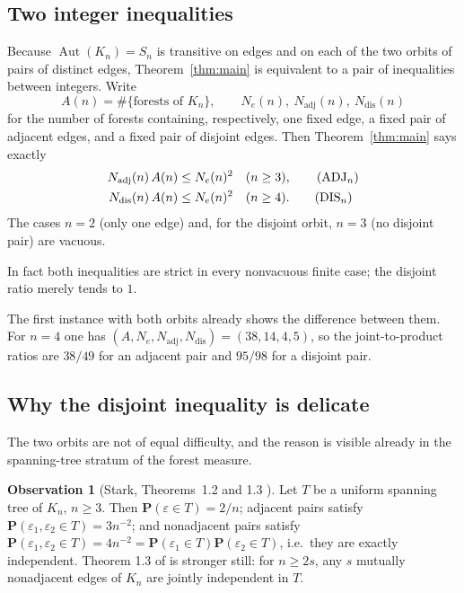 \documentclass[11pt,a4paper]{amsart}
\theoremstyle{plain}
\theoremstyle{definition}
\newtheorem{observation}[theorem]{Observation}
\newcommand{\PR}{\mathbf{P}}
\newcommand{\Nc}{N}
\begin{document}
\subsection{Two integer inequalities}

Because $\operatorname{Aut}(K_n) = S_n$ is transitive on edges and on each of the
two orbits of pairs of distinct edges, Theorem~\ref{thm:main} is equivalent to a
pair of inequalities between integers. Write
\[
  A(n) = \#\{\text{forests of } K_n\},\qquad
  \Nc_e(n),\ \Nc_{\mathrm{adj}}(n),\ \Nc_{\mathrm{dis}}(n)
\]
for the number of forests containing, respectively, one fixed edge, a fixed pair
of adjacent edges, and a fixed pair of disjoint edges. Then
Theorem~\ref{thm:main} says exactly
\begin{align}
  \Nc_{\mathrm{adj}}(n)\,A(n) &\le \Nc_e(n)^2 && (n \ge 3), \tag{$\mathrm{ADJ}_n$}\\
  \Nc_{\mathrm{dis}}(n)\,A(n) &\le \Nc_e(n)^2 && (n \ge 4). \tag{$\mathrm{DIS}_n$}
\end{align}
The cases $n=2$ (only one edge) and, for the disjoint orbit, $n=3$ (no disjoint
pair) are vacuous.

In fact both inequalities are strict in every nonvacuous finite case; the
disjoint ratio merely tends to $1$.

The first instance with both orbits already shows the difference between them.
For $n=4$ one has
$(A,\Nc_e,\Nc_{\mathrm{adj}},\Nc_{\mathrm{dis}})=(38,14,4,5)$, so the
joint-to-product ratios are $38/49$ for an adjacent pair and $95/98$ for a
disjoint pair.

\subsection{Why the disjoint inequality is delicate}\label{ss:delicate}

The two orbits are not of equal difficulty, and the reason is visible already in
the spanning-tree stratum of the forest measure.

\begin{observation}[Stark, Theorems~1.2 and 1.3 \cite{Stark2011}]\label{obs:ust}
Let $T$ be a uniform spanning tree of $K_n$, $n \ge 3$. Then
$\PR(\varepsilon \in T) = 2/n$; adjacent pairs satisfy
$\PR(\varepsilon_1,\varepsilon_2 \in T) = 3n^{-2}$; and nonadjacent pairs satisfy
$\PR(\varepsilon_1,\varepsilon_2 \in T) = 4n^{-2}
= \PR(\varepsilon_1\in T)\PR(\varepsilon_2 \in T)$, i.e.\ they are exactly
independent. Theorem 1.3 of \cite{Stark2011} is stronger still: for $n \ge 2s$,
any $s$ mutually nonadjacent edges of $K_n$ are jointly independent in $T$.
\end{observation}
\end{document}
